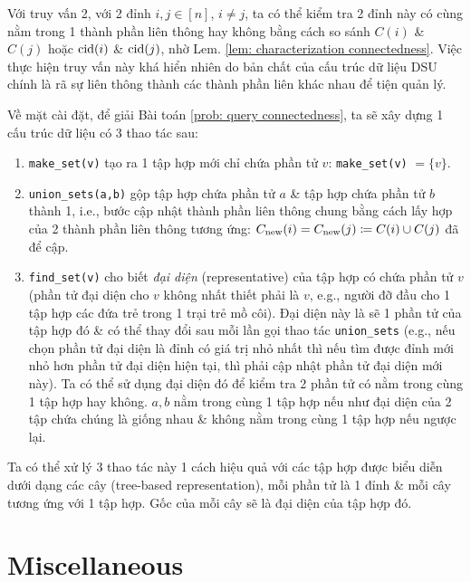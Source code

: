 \documentclass{article}
\begin{document}
Với truy vấn 2, với 2 đỉnh $i,j\in[n]$, $i\ne j$, ta có thể kiểm tra 2 đỉnh này có cùng nằm trong 1 thành phần liên thông hay không bằng cách so sánh $C(i)$ \& $C(j)$ hoặc ${\rm cid}(i)$ \& ${\rm cid}(j)$, nhờ Lem. \ref{lem: characterization connectedness}. Việc thực hiện truy vấn này khá hiển nhiên do bản chất của cấu trúc dữ liệu DSU chính là rã sự liên thông thành các thành phần liên khác nhau để tiện quản lý.

Về mặt cài đặt, để giải Bài toán \ref{prob: query connectedness}, ta sẽ xây dựng 1 cấu trúc dữ liệu có 3 thao tác sau:
\begin{enumerate}
    \item \verb|make_set(v)| tạo ra 1 tập hợp mới chỉ chứa phần tử $v$: \verb|make_set(v)| $= \{v\}$.
    \item \verb|union_sets(a,b)| gộp tập hợp chứa phần tử $a$ \& tập hợp chứa phần tử $b$ thành 1, i.e., bước cập nhật thành phần liên thông chung bằng cách lấy hợp của 2 thành phần liên thông tương ứng: $C_{\rm new}(i) = C_{\rm new}(j)\coloneqq C(i)\cup C(j)$ đã để cập.
    \item \verb|find_set(v)| cho biết {\it đại diện} (representative) của tập hợp có chứa phần tử $v$ (phần tử đại diện cho $v$ không nhất thiết phải là $v$, e.g., người đỡ đầu cho 1 tập hợp các đứa trẻ trong 1 trại trẻ mồ côi). Đại diện này là sẽ 1 phần tử của tập hợp đó \& có thể thay đổi sau mỗi lần gọi thao tác \verb|union_sets| (e.g., nếu chọn phần tử đại diện là đỉnh có giá trị nhỏ nhất thì nếu tìm được đỉnh mới nhỏ hơn phần tử đại diện hiện tại, thì phải cập nhật phần tử đại diện mới này). Ta có thể sử dụng đại diện đó để kiểm tra 2 phần tử có nằm trong cùng 1 tập hợp hay không. $a,b$ nằm trong cùng 1 tập hợp nếu như đại diện của 2 tập chứa chúng là giống nhau \& không nằm trong cùng 1 tập hợp nếu ngược lại.
\end{enumerate}
Ta có thể xử lý 3 thao tác này 1 cách hiệu quả với các tập hợp được biểu diễn dưới dạng các cây (tree-based representation), mỗi phần tử là 1 đỉnh \& mỗi cây tương ứng với 1 tập hợp. Gốc của mỗi cây sẽ là đại diện của tập hợp đó.






\section{Miscellaneous}


\printbibliography[heading=bibintoc]
\end{document}
